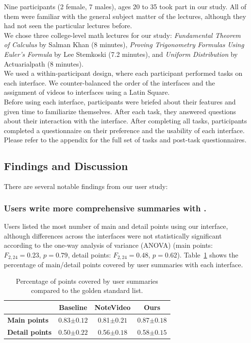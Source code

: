 Nine participants (2 female, 7 males), ages 20 to 35 took part in our study. 
All of them were familiar with the general subject matter of the lectures, although they had not seen the particular lectures before.\\

We chose three college-level math lectures for our study: \textit{Fundamental Theorem of Calculus} by Salman Khan (8 minutes), \textit{Proving Trigonometry Formulas Using Euler's Formula} by Lee Stemkoski (7.2 minutes), and \textit{Uniform Distribution} by Actuarialpath (8 minutes).\\
We used a within-participant design, where each participant performed tasks on each interface. We counter-balanced the order of the interfaces and the assignment of videos to interfaces using a Latin Square.\\

Before using each interface, participants were briefed about their features and given time to familiarize themselves. After each task, they answered questions about their interaction with the interface. After completing all tasks, participants completed a questionnaire on their preference and the usability of each interface. Please refer to the appendix for the full set of tasks and post-task questionnaires.
\subsection{Findings and Discussion}
There are several notable findings from our user study:

\subsubsection{Users write more comprehensive summaries with \systemname .}
Users listed the most number of main and detail points using our interface,
although differences across the interfaces were not statistically significant
according to the one-way analysis of variance (ANOVA) (main points:
$F_{2,24}=0.23$, $p=0.79$, detail points: $F_{2,24}=0.48$, $p=0.62$). Table~\ref{Tab:summary_results} shows the percentage of main/detail
points covered by user summaries with each interface.

\begin{table}[!h]
 \centering
 \begin{tabular}{ l |c c c}
 \hline
    & \textbf{Baseline} & \textbf{NoteVideo} & \textbf{Ours} \\\hline
   \textbf{Main points} & 0.83$\pm0.12$ & 0.81$\pm0.21$ & 0.87$\pm0.18$\\
   \textbf{Detail points} & 0.50$\pm0.22$ & 0.56$\pm0.18$ & 0.58$\pm0.15$\\
   \hline
 \end{tabular}
         \captionsetup{font=footnotesize}
 \caption{Percentage of points covered by user summaries compared to the
golden standard list.}
 \label{Tab:summary_results}
\end{table}

